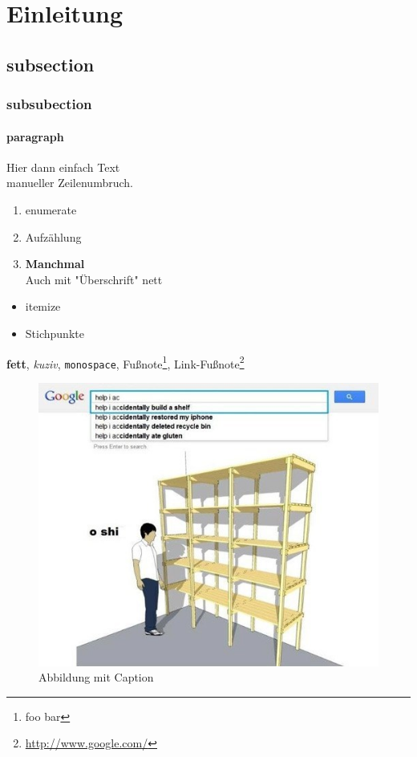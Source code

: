\clearpage
{}
\section{Einleitung}
\subsection{subsection}
\subsubsection{subsubection}
\paragraph{paragraph}
Hier dann einfach Text\\
manueller Zeilenumbruch.
\begin{enumerate}
	\item enumerate
	\item Aufzählung
	\item \textbf{Manchmal}\\
	Auch mit "Überschrift" nett
\end{enumerate}
\begin{itemize}
	\item itemize
	\item Stichpunkte
\end{itemize}
\textbf{fett}, \emph{kuziv}, \texttt{monospace}, Fußnote\footnote{foo bar}, Link-Fußnote\footnote{\url{http://www.google.com/}}
\begin{figure}[htb]
\centering
\includegraphics[width=\textwidth]{img/foo.png}
\caption{Abbildung mit Caption}
\label{fig:foo_00}
\end{figure}
